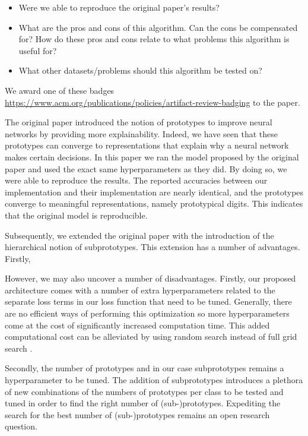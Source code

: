 \begin{itemize}
    \item Were we able to reproduce the original paper's results?
    \item What are the pros and cons of this algorithm. Can the cons be compensated for? How do these pros and cons relate to what problems this algorithm is useful for?
    \item What other datasets/problems should this algorithm be tested on?
\end{itemize}
We award one of these badges \url{https://www.acm.org/publications/policies/artifact-review-badging} to the paper. 

The original paper \cite{li2018deep} introduced the notion of prototypes to improve neural networks by providing more explainability. Indeed, we have seen that these prototypes can converge to representations that explain why a neural network makes certain decisions. In this paper we ran the model proposed by the original paper and used the exact same hyperparameters as they did. By doing so, we were able to reproduce the results. The reported accuracies between our implementation and their implementation are nearly identical, and the prototypes converge to meaningful representations, namely prototypical digits. This indicates that the original model is reproducible. 

Subsequently, we extended the original paper with the introduction of the hierarchical notion of subprototypes. This extension has a number of advantages. Firstly, 

However, we may also uncover a number of disadvantages. Firstly, our proposed architecture comes with a number of extra hyperparameters related to the separate loss terms in our loss function that need to be tuned. Generally, there are no efficient ways of performing this optimization \cite{paramoptimization} so more hyperparameters come at the cost of significantly increased computation time. This added computational cost can be alleviated by using random search instead of full grid search \cite{paramoptimization}.

Secondly, the number of prototypes and in our case subprototypes remains a hyperparameter to be tuned. The addition of subprototypes introduces a plethora of new combinations of the numbers of prototypes per class to be tested and tuned in order to find the right number of (sub-)prototypes. Expediting the search for the best number of (sub-)prototypes remains an open research question.

